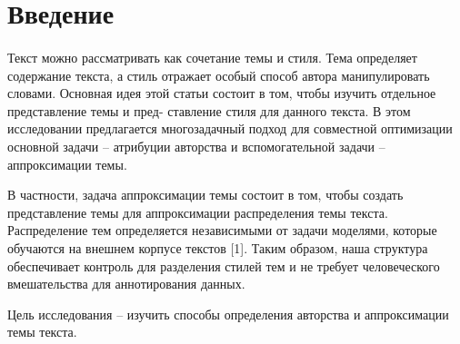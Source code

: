 \section{Введение}

\paragraph*{} Текст можно рассматривать как сочетание темы и стиля. Тема определяет содержание текста, а стиль отражает особый способ 
автора манипулировать словами. Основная 
идея этой статьи состоит в том, чтобы изучить отдельное представление темы и пред- ставление стиля для данного текста. 
В этом исследовании предлагается многозадачный подход для совместной оптимизации основной задачи – атрибуции 
авторства и вспомогательной задачи – аппроксимации темы.
\par В частности, задача аппроксимации 
темы состоит в том, чтобы создать представление темы для аппроксимации распределения темы текста. 
Распределение тем определяется независимыми от задачи моделями, которые обучаются на внешнем корпусе текстов [1]. 
Таким образом, наша структура обеспечивает контроль для разделения стилей тем и не требует человеческого вмешательства 
для аннотирования данных.
\par Цель исследования – изучить способы определения авторства и аппроксимации темы текста.